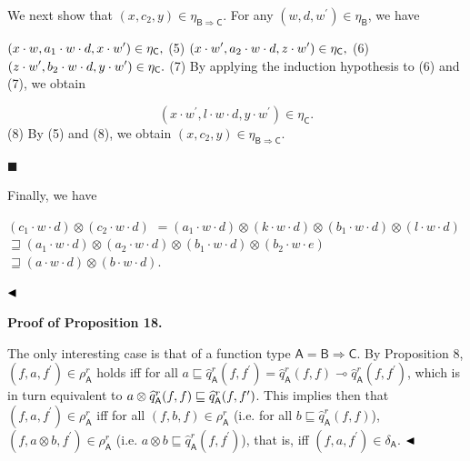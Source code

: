 \documentclass[10pt,a4paper]{amsart}
\begin{document}
We next show that $(x,c_{2},y)\in\eta_{\mathsf{B}\Rightarrow\mathsf{C}}$. For any $(w,d,w^{\prime})\in\eta_{\mathsf{B}}$, we have\par
    $\displaystyle(x\cdot w,a_{1}\cdot w\cdot d,x\cdot w^{\prime})\in\eta_{\mathsf{%
C}},$  (5)    $\displaystyle(x\cdot w^{\prime},a_{2}\cdot w\cdot d,z\cdot w^{\prime})\in\eta_%
{\mathsf{C}},$  (6)    $\displaystyle(z\cdot w^{\prime},b_{2}\cdot w\cdot d,y\cdot w^{\prime})\in\eta_%
{\mathsf{C}}.$  (7)   
By applying the induction hypothesis to (6) and (7), we obtain\par
    \[(x\cdot w^{\prime},l\cdot w\cdot d,y\cdot w^{\prime})\in\eta_{\mathsf{C}}.\]  (8)   
By (5) and (8), we obtain $(x,c_{2},y)\in\eta_{\mathsf{B}\Rightarrow\mathsf{C}}$.\par
 
 
 
\par\noindent  $\blacksquare$ 
 
Finally, we have\par
    $\displaystyle(c_{1}\cdot w\cdot d)\otimes(c_{2}\cdot w\cdot d)$ $\displaystyle=(a_{1}\cdot w\cdot d)\otimes(k\cdot w\cdot d)\otimes(b_{1}\cdot w%
\cdot d)\otimes(l\cdot w\cdot d)$      $\displaystyle\sqsupseteq(a_{1}\cdot w\cdot d)\otimes(a_{2}\cdot w\cdot d)%
\otimes(b_{1}\cdot w\cdot d)\otimes(b_{2}\cdot w\cdot e)$      $\displaystyle\sqsupseteq(a\cdot w\cdot d)\otimes(b\cdot w\cdot d).\ $    
 
  
$\hfill\blacktriangleleft$\par
 
 
 
 
\par\medskip\noindent\textbf{Proof of Proposition 18.}\par
 
 
The only interesting case is that of a function type $\mathsf{A}=\mathsf{B}\Rightarrow\mathsf{C}$. By Proposition 8, $(f,a,f^{\prime})\in\rho_{\mathsf{A}}^{r}$ holds iff for all $a\sqsubseteq\widehat{q}_{\mathsf{A}}^{r}(f,f^{\prime})=\widehat{q}_{\mathsf{A}%
}^{r}(f,f)\multimap\widehat{q}_{\mathsf{A}}^{r}(f,f^{\prime})$, which is in turn equivalent to $a\otimes\widehat{q}_{\mathsf{A}}^{r}(f,f)\sqsubseteq\widehat{q}_{\mathsf{A}}^{%
r}(f,f^{\prime})$. This implies then that $(f,a,f^{\prime})\in\rho_{\mathsf{A}}^{r}$ iff for all $(f,b,f)\in\rho_{\mathsf{A}}^{r}$ (i.e. for all $b\sqsubseteq\widehat{q}^{r}_{\mathsf{A}}(f,f)$), $(f,a\otimes b,f^{\prime})\in\rho_{\mathsf{A}}^{r}$ (i.e. $a\otimes b\sqsubseteq\widehat{q}^{r}_{\mathsf{A}}(f,f^{\prime})$), that is, iff $(f,a,f^{\prime})\in\delta_{\mathsf{A}}$. $\hfill\blacktriangleleft$\par
 
\end{document}
